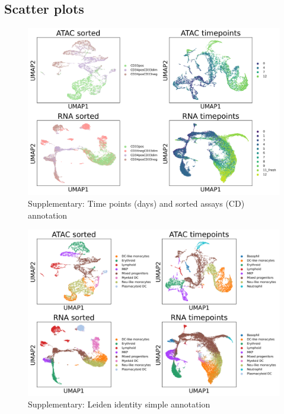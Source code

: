 \documentclass[a4paper]{article}
\begin{document}
\subsection{Scatter plots}

\begin{figure}[!htb]
  \centering
  \includegraphics[width=\textwidth]{../figures/hematopoiesis/label.png}
  \caption{Supplementary: Time points (days) and sorted assays (CD) annotation}
\end{figure}

\begin{figure}[!htb]
  \centering
  \includegraphics[width=\textwidth]{../figures/hematopoiesis/leiden_identity_simple2.png}
  \caption{Supplementary: Leiden identity simple annotation}
\end{figure}
\end{document}
